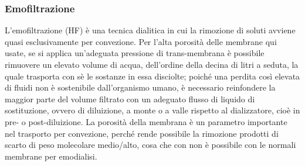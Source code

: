 \subsubsection{Emofiltrazione}
L'emofiltrazione (HF) è una tecnica dialitica in cui la rimozione di soluti avviene quasi esclusivamente per convezione. Per l'alta porosità delle membrane qui usate, se si applica un'adeguata pressione di trans-membrana è possibile rimuovere un elevato volume di acqua, dell'ordine della decina di litri a seduta, la quale trasporta con sè le sostanze in essa disciolte; poiché una perdita così elevata di fluidi non è sostenibile dall'organismo umano, è necessario reinfondere la maggior parte del volume filtrato con un adeguato flusso di liquido di sostituzione, ovvero di diluizione, a monte o a valle rispetto al dializzatore, cioè in pre- o post-diluizione. La porosità della membrana è un parametro importante nel trasporto per convezione, perché rende possibile la rimozione prodotti di scarto di peso molecolare medio/alto, cosa che con non è possibile con le normali membrane per emodialisi.

